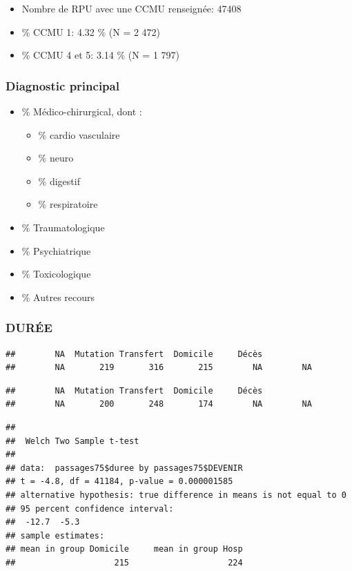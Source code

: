 \documentclass[]{article}
\begin{document}
\begin{itemize}
\itemsep1pt\parskip0pt
\item
  Nombre de RPU avec une CCMU renseignée: 47408
\item
  \% CCMU 1: 4.32 \% (N = 2 472)
\item
  \% CCMU 4 et 5: 3.14 \% (N = 1 797)
\end{itemize}

\subsubsection{Diagnostic principal}\label{diagnostic-principal}

\begin{itemize}
\itemsep1pt\parskip0pt
\item
  \% Médico-chirurgical, dont :

  \begin{itemize}
  \itemsep1pt\parskip0pt
  \item
    \% cardio vasculaire
  \item
    \% neuro
  \item
    \% digestif
  \item
    \% respiratoire
  \end{itemize}
\item
  \% Traumatologique
\item
  \% Psychiatrique
\item
  \% Toxicologique
\item
  \% Autres recours
\end{itemize}

\subsubsection{DURÉE}\label{duree}

\begin{verbatim}
##        NA  Mutation Transfert  Domicile     Décès           
##        NA       219       316       215        NA        NA
\end{verbatim}

\begin{verbatim}
##        NA  Mutation Transfert  Domicile     Décès           
##        NA       200       248       174        NA        NA
\end{verbatim}

\begin{verbatim}
## 
##  Welch Two Sample t-test
## 
## data:  passages75$duree by passages75$DEVENIR
## t = -4.8, df = 41184, p-value = 0.000001585
## alternative hypothesis: true difference in means is not equal to 0
## 95 percent confidence interval:
##  -12.7  -5.3
## sample estimates:
## mean in group Domicile     mean in group Hosp 
##                    215                    224
\end{verbatim}
\end{document}
